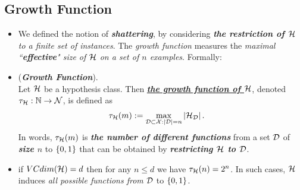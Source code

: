 \documentclass[11pt]{article}
\begin{document}
\subsection{Growth Function}
\begin{itemize}
\item \begin{remark}
We defined the notion of \emph{\textbf{shattering}}, by considering \emph{\textbf{the restriction of ${\mathcal H}$} to a finite set of instances}. The \emph{growth function} measures the \emph{maximal ``\textbf{effective}" size of ${\mathcal H}$ on a set of $n$ examples}. Formally:
\end{remark}

\item \begin{definition} (\emph{\textbf{Growth Function}}). \\
Let ${\mathcal H}$ be a hypothesis class. Then \underline{\emph{\textbf{the growth function of ${\mathcal H}$}}}, denoted $\tau_{{\mathcal H}}: {\mathbb N} \to {\mathcal N}$, is defined as
\begin{align*}
\tau_{{\mathcal H}}(m) &:= \max_{{\mathcal D} \subset {\mathcal X}: \left\lvert {\mathcal D} \right\rvert = n}\left\lvert {\mathcal H}_{{\mathcal D}} \right\rvert.
\end{align*}
In words, $\tau_{{\mathcal H}}(m)$ is \textbf{\emph{the number of different functions}} from a set ${\mathcal D}$ of \emph{\textbf{size $n$}} to $\left\{0,1\right\}$ that can be obtained by \emph{\textbf{restricting ${\mathcal H}$ to ${\mathcal D}$}}.
\end{definition}

\item \begin{remark}
if $VCdim({\mathcal H}) = d$ then for any $n \le d$ we have $\tau_{{\mathcal H}}(n) = 2^n$. In such cases, ${\mathcal H}$ induces \emph{all possible functions from} ${\mathcal D}$ to $\left\{0,1\right\}$. 
\end{remark}


\end{itemize}
\end{document}
